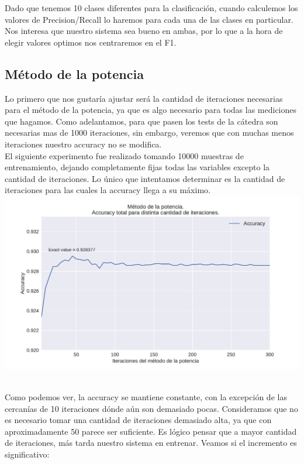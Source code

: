 Dado que tenemos 10 clases diferentes para la clasificación, cuando calculemos los valores de Precision/Recall lo haremos para cada una de las clases en particular. Nos interesa que nuestro sistema sea bueno en ambas, por lo que a la hora de elegir valores optimos nos centraremos en el F1. \\

\newpage
\subsection{Método de la potencia}

Lo primero que nos gustaría ajustar será la cantidad de iteraciones necesarias para el método de la potencia, ya que es algo necesario para todas las mediciones que hagamos. Como adelantamos, para que pasen los tests de la cátedra son necesarias mas de 1000 iteraciones, sin embargo, veremos que con muchas menos iteraciones nuestro accuracy no se modifica. \\

El siguiente experimento fue realizado tomando 10000 muestras de entrenamiento, dejando completamente fijas todas las variables excepto la cantidad de iteraciones. Lo único que intentamos determinar es la cantidad de iteraciones para las cuales la accuracy llega a su máximo. \\

{\centering
    \includegraphics[scale=0.55]{informe/imagenes/potencia/accuracyPorItersREENTREGA.pdf} \\
}
$ $\newline

Como podemos ver, la accuracy se mantiene constante, con la excepción de las cercanías de 10 iteraciones dónde aún son demasiado pocas. Consideramos que no es necesario tomar una cantidad de iteraciones demasiado alta, ya que con aproximadamente 50 parece ser suficiente. Es lógico pensar que a mayor cantidad de iteraciones, más tarda nuestro sistema en entrenar. Veamos si el incremento es significativo: \\

